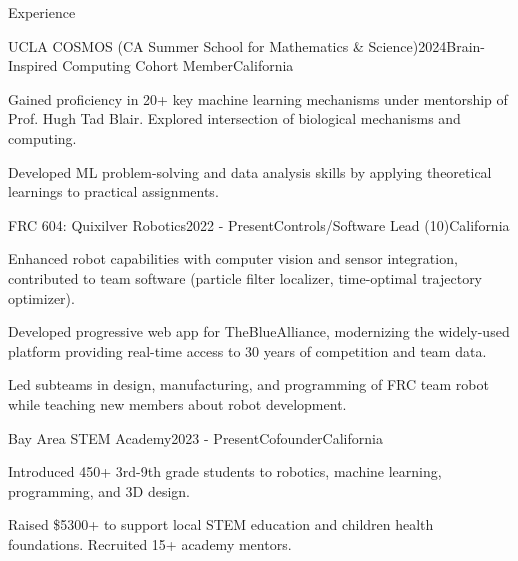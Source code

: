 \documentclass[
  11pt, %
]{resume} %
\begin{document}
\sloppy


\begin{rSection}{Experience}


  \begin{rSubsection}{UCLA COSMOS (CA Summer School for Mathematics \& Science)}{2024}{Brain-Inspired Computing Cohort Member}{California}
    
    \item Gained proficiency in 20+ key machine learning mechanisms under mentorship of Prof. Hugh Tad Blair. Explored intersection of biological mechanisms and computing.
    
    \item Developed ML problem-solving and data analysis skills by applying theoretical learnings to practical assignments.
    
  \end{rSubsection}
        
  \begin{rSubsection}{FRC 604: Quixilver Robotics}{2022 - Present}{Controls/Software Lead (10)}{California}
    
    \item Enhanced robot capabilities with computer vision and sensor integration, contributed to team software (particle filter localizer, time-optimal trajectory optimizer).
    
    \item Developed progressive web app for TheBlueAlliance, modernizing the widely-used platform providing real-time access to 30 years of competition and team data.
    
    \item Led subteams in design, manufacturing, and programming of FRC team robot while teaching new members about robot development.
    
  \end{rSubsection}
        
  \begin{rSubsection}{Bay Area STEM Academy}{2023 - Present}{Cofounder}{California}
    
    \item Introduced 450+ 3rd-9th grade students to robotics, machine learning, programming, and 3D design.
    
    \item Raised \$5300+ to support local STEM education and children health foundations. Recruited 15+ academy mentors.
    
  \end{rSubsection}
        
	
\end{rSection}
\end{document}
